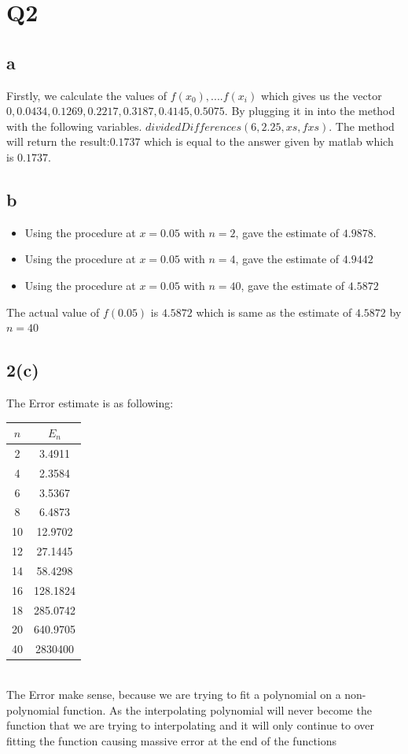 \documentclass{article}
\begin{document}
\section{Q2}
\subsection*{a}
Firstly, we calculate the values of $f(x_0),....f(x_i)$ which gives us the vector $0, 0.0434,
0.1269, 0.2217, 0.3187, 0.4145, 0.5075$. By plugging it in into the method with the following variables.
$dividedDifferences(6,2.25,xs,fxs)$. The method will return the result:$0.1737$ 
which is equal to the answer given by matlab which is $0.1737$.
\subsection*{b}
\begin{itemize}
	\item Using the procedure at $x=0.05$ with $n=2$, gave the estimate of $4.9878$.
	\item Using the procedure at $x=0.05$ with $n=4$, gave the estimate of $4.9442$
	\item Using the procedure at $x=0.05$ with $n=40$, gave the estimate of $4.5872$
\end{itemize}
The actual value of $f(0.05)$ is $4.5872$ which is same as the estimate of $4.5872$ by $n=40$
\subsection*{2(c)}
The Error estimate is as following:\\
\begin{tabular}{|c|c|}
\hline
$n$ & $E_n$ \\ \hline
2 & 3.4911\\
4 & 2.3584\\
6 & 3.5367\\
8 & 6.4873\\
10 & 12.9702\\
12 & 27.1445\\
14 & 58.4298\\
16 & 128.1824\\
18 & 285.0742\\
20 & 640.9705\\
40 & 2830400\\
\hline
\end{tabular}\\
The Error make sense, because we are trying to fit a polynomial on a non-polynomial function. As the interpolating polynomial will never become the function that we are trying to interpolating and it will only continue to over fitting the function causing massive error at the end of the functions
\end{document}
